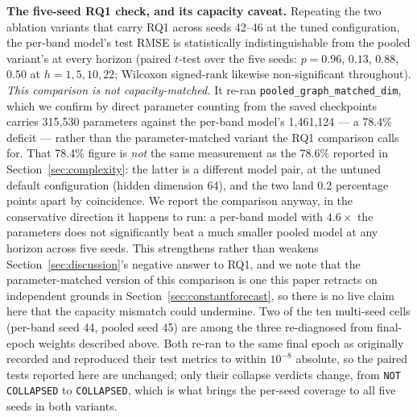\documentclass[journal]{IEEEtran}
\begin{document}
\textbf{The five-seed RQ1 check, and its capacity caveat.} Repeating the two
ablation variants that carry RQ1 across seeds 42--46 at the tuned configuration,
the per-band model's test RMSE is statistically indistinguishable from the pooled
variant's at every horizon (paired $t$-test over the five seeds: $p = 0.96$,
$0.13$, $0.88$, $0.50$ at $h = 1, 5, 10, 22$; Wilcoxon signed-rank likewise
non-significant throughout). \emph{This comparison is not capacity-matched.} It
re-ran \texttt{pooled\_graph\_matched\_dim}, which we confirm by direct parameter
counting from the saved checkpoints carries 315{,}530 parameters against the
per-band model's 1{,}461{,}124 --- a 78.4\% deficit --- rather than the
parameter-matched variant the RQ1 comparison calls for. That 78.4\% figure is
\emph{not} the same measurement as the 78.6\% reported in
Section~\ref{sec:complexity}: the latter is a different model pair, at the untuned
default configuration (hidden dimension 64), and the two land 0.2 percentage
points apart by coincidence. We report the comparison anyway, in the conservative
direction it happens to run: a per-band model with $4.6\times$ the parameters does
not significantly beat a much smaller pooled model at any horizon across five
seeds. This strengthens rather than weakens Section~\ref{sec:discussion}'s
negative answer to RQ1, and we note that the parameter-matched version of this
comparison is one this paper retracts on independent grounds in
Section~\ref{sec:constantforecast}, so there is no live claim here that the
capacity mismatch could undermine. Two of the ten multi-seed cells (per-band
seed 44, pooled seed 45) are among the three re-diagnosed from final-epoch
weights described above. Both re-ran to the same final epoch as originally
recorded and reproduced their test metrics to within $10^{-8}$ absolute, so the
paired tests reported here are unchanged; only their collapse verdicts change,
from \texttt{NOT COLLAPSED} to \texttt{COLLAPSED}, which is what brings the
per-seed coverage to all five seeds in both variants.
\end{document}
